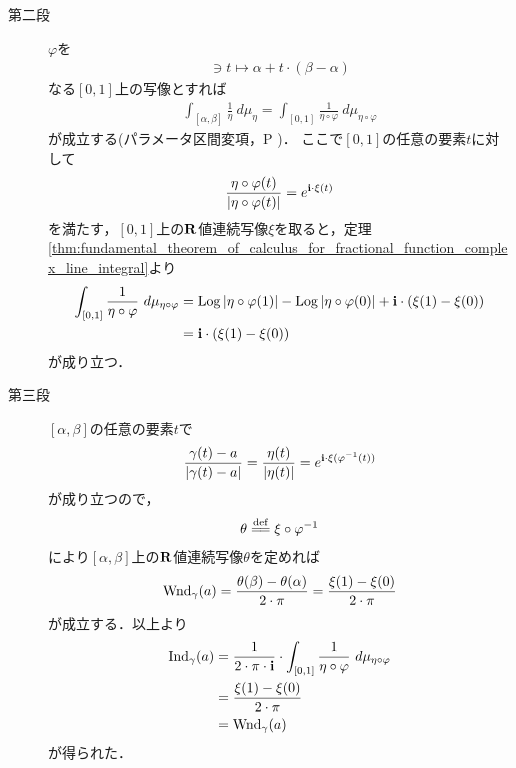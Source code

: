 \begin{sketch}
\begin{description}
			\item[第二段]
				$\varphi$を
				\begin{align}
					[0,1] \ni t \longmapsto \alpha + t \cdot (\beta - \alpha)
				\end{align}
				なる$[0,1]$上の写像とすれば
				\begin{align}
					\int_{[\alpha,\beta]} \frac{1}{\eta}\ d\mu_{\eta}
					= \int_{[0,1]} \frac{1}{\eta \circ \varphi}\ d\mu_{\eta \circ \varphi}
				\end{align}
				が成立する(パラメータ区間変項，P \pageref{fom:change_of_parameter_interval_complex_contour_integral})．
				ここで$[0,1]$の任意の要素$t$に対して
				\begin{align}
					\frac{\eta \circ \varphi(t)}{|\eta \circ \varphi(t)|} = e^{\mathbf{i} \cdot \xi(t)}
				\end{align}
				を満たす，$[0,1]$上の$\mathbf{R}$値連続写像$\xi$を取ると，定理\ref{thm:fundamental_theorem_of_calculus_for_fractional_function_complex_line_integral}より
				\begin{align}
					\int_{[0,1]} \frac{1}{\eta \circ \varphi}\ d\mu_{\eta \circ \varphi}
					&= \pvlog{|\eta \circ \varphi(1)|} - \pvlog{|\eta \circ \varphi(0)|}
					+ \isym \cdot (\xi(1) - \xi(0)) \\
					&= \isym \cdot (\xi(1) - \xi(0))
				\end{align}
				が成り立つ．
			
			\item[第三段]
				$[\alpha,\beta]$の任意の要素$t$で
				\begin{align}
					\frac{\gamma(t)-a}{|\gamma(t) - a|}
					= \frac{\eta(t)}{|\eta(t)|}
					= e^{\mathbf{i} \cdot \xi(\varphi^{-1}(t))}
				\end{align}
				が成り立つので，
				\begin{align}
					\theta \defeq \xi \circ \varphi^{-1}
				\end{align}
				により$[\alpha,\beta]$上の$\mathbf{R}$値連続写像$\theta$を定めれば
				\begin{align}
					\operatorname{Wnd}_{\gamma}(a) = \frac{\theta(\beta) - \theta(\alpha)}{2 \cdot \pi}
					= \frac{\xi(1) - \xi(0)}{2 \cdot \pi}
				\end{align}
				が成立する．以上より
				\begin{align}
					\operatorname{Ind}_{\gamma}(a)
					&= \frac{1}{2\cdot\pi\cdot\mathbf{i}} \cdot \int_{[0,1]} \frac{1}{\eta \circ \varphi}\ d\mu_{\eta \circ \varphi} \\
					&= \frac{\xi(1) - \xi(0)}{2 \cdot \pi} \\
					&= \operatorname{Wnd}_{\gamma}(a)
				\end{align}
				が得られた．
				\QED
		\end{description}
	\end{sketch}